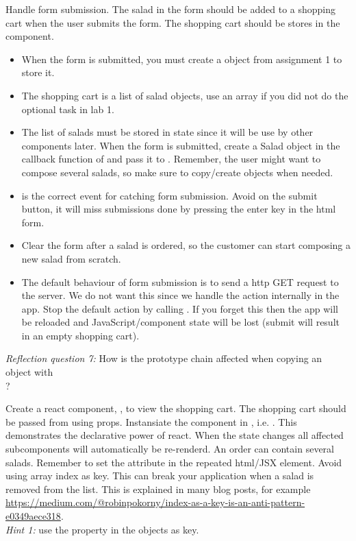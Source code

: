 \documentclass[fleqn, article, a4paper]{memoir}
\begin{document}
\begin{Assignments}
\item Handle form submission. The salad in the form should be added to a shopping cart when the user submits the form. The shopping cart should be stores in the  component.
\begin{itemize}
  \item When the form is submitted, you must create a  object from assignment 1 to store it.
  \item The shopping cart is a list of salad objects, use an array if you did not do the optional task in lab 1.
  \item The list of salads must be stored in  state since it will be use by other components later. When the form is submitted, create a Salad object in the callback function of  and pass it to . Remember, the user might want to compose several salads, so make sure to copy/create objects when needed.
  \item {} is the correct event for catching form submission. Avoid  on the submit button, it will miss submissions done by pressing the enter key in the html form.
  \item Clear the form after a salad is ordered, so the customer can start composing a new salad from scratch.
  \item The default behaviour of form submission is to send a http GET request to the server. We do not want this since we handle the action internally in the app. Stop the default action by calling . If you forget this then the app will be reloaded and JavaScript/component state will be lost (submit will result in an empty shopping cart).
\end{itemize}
\emph{Reflection question 7:} How is the prototype chain affected when copying an object with \\?

\item Create a react component, , to view the shopping cart. The shopping cart should be passed from  using props. Instansiate the  component in , i.e. . This demonstrates the declarative power of react. When the state changes all affected subcomponents will automatically be re-renderd.
\newline
\newline
An order can contain several salads. Remember to set the  attribute in the repeated html/JSX element. Avoid using array index as key. This can break your application when a salad is removed from the list. This is explained in many blog posts, for example \url{https://medium.com/@robinpokorny/index-as-a-key-is-an-anti-pattern-e0349aece318}.
\\ \noindent \emph{Hint 1:} use the  property in the  objects as key.


\end{Assignments}
\end{document}

